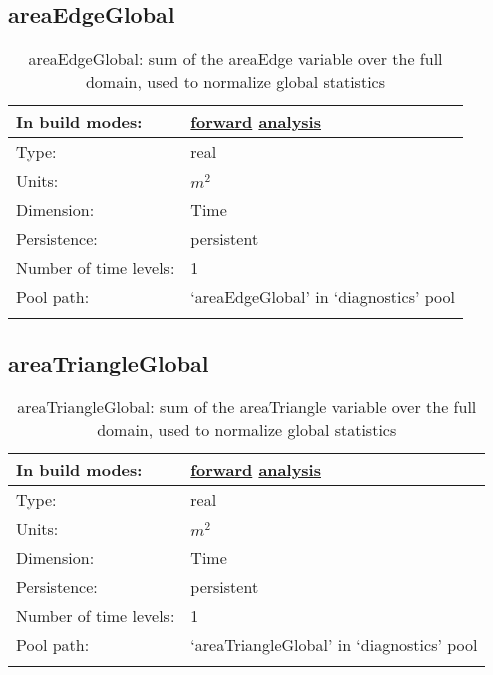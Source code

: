 \subsection[areaEdgeGlobal]{areaEdgeGlobal}
\label{subsec:var_sec_diagnostics_areaEdgeGlobal}
\begin{center}
\begin{longtable}{| p{2.0in} | p{4.0in} |}
        \hline 
        In build modes: & \hyperref[subsec:forward_var_tab_diagnostics]{forward} \hyperref[subsec:analysis_var_tab_diagnostics]{analysis} \\
        \hline 
        Type: & real \\
        \hline 
        Units: & $m^2$ \\
        \hline 
        Dimension: & Time \\
        \hline 
        Persistence: & persistent \\
        \hline 
        Number of time levels: & 1 \\
        \hline 
            Pool path: & `areaEdgeGlobal' in `diagnostics' pool \\
		 \hline 
    \caption{areaEdgeGlobal: sum of the areaEdge variable over the full domain, used to normalize global statistics}
\end{longtable}
\end{center}
\subsection[areaTriangleGlobal]{areaTriangleGlobal}
\label{subsec:var_sec_diagnostics_areaTriangleGlobal}
\begin{center}
\begin{longtable}{| p{2.0in} | p{4.0in} |}
        \hline 
        In build modes: & \hyperref[subsec:forward_var_tab_diagnostics]{forward} \hyperref[subsec:analysis_var_tab_diagnostics]{analysis} \\
        \hline 
        Type: & real \\
        \hline 
        Units: & $m^2$ \\
        \hline 
        Dimension: & Time \\
        \hline 
        Persistence: & persistent \\
        \hline 
        Number of time levels: & 1 \\
        \hline 
            Pool path: & `areaTriangleGlobal' in `diagnostics' pool \\
		 \hline 
    \caption{areaTriangleGlobal: sum of the areaTriangle variable over the full domain, used to normalize global statistics}
\end{longtable}
\end{center}
